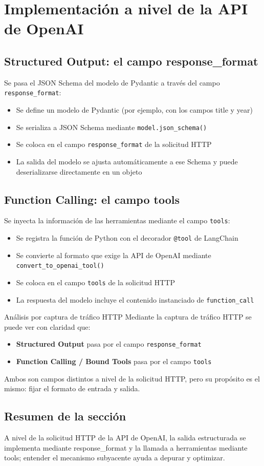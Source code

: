 \section{Implementación a nivel de la API de OpenAI}

\subsection{Structured Output: el campo response\_format}

Se pasa el JSON Schema del modelo de Pydantic a través del campo \texttt{response\_format}:

\begin{itemize}
    \item Se define un modelo de Pydantic (por ejemplo, con los campos title y year)
    \item Se serializa a JSON Schema mediante \texttt{model.json\_schema()}
    \item Se coloca en el campo \texttt{response\_format} de la solicitud HTTP
    \item La salida del modelo se ajusta automáticamente a ese Schema y puede deserializarse directamente en un objeto
\end{itemize}

\subsection{Function Calling: el campo tools}

Se inyecta la información de las herramientas mediante el campo \texttt{tools}:

\begin{itemize}
    \item Se registra la función de Python con el decorador \texttt{@tool} de LangChain
    \item Se convierte al formato que exige la API de OpenAI mediante \texttt{convert\_to\_openai\_tool()}
    \item Se coloca en el campo \texttt{tools} de la solicitud HTTP
    \item La respuesta del modelo incluye el contenido instanciado de \texttt{function\_call}
\end{itemize}

\begin{knowledgebox}{Análisis por captura de tráfico HTTP}
Mediante la captura de tráfico HTTP se puede ver con claridad que:
\begin{itemize}
    \item \textbf{Structured Output} pasa por el campo \texttt{response\_format}
    \item \textbf{Function Calling / Bound Tools} pasa por el campo \texttt{tools}
\end{itemize}
Ambos son campos distintos a nivel de la solicitud HTTP, pero su propósito es el mismo: fijar el formato de entrada y salida.
\end{knowledgebox}

\subsection{Resumen de la sección}

A nivel de la solicitud HTTP de la API de OpenAI, la salida estructurada se implementa mediante response\_format y la llamada a herramientas mediante tools; entender el mecanismo subyacente ayuda a depurar y optimizar.


